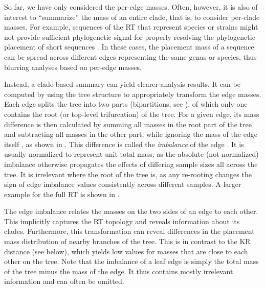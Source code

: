 So far, we have only considered the per-edge masses.
Often, however, it is also of interest to ``summarize'' the mass of an entire clade, that is, to consider per-clade masses.
For example, sequences of the \ac{RT} that represent species or strains might not provide sufficient phylogenetic signal
for properly resolving the phylogenetic placement of short sequences \cite{Dunthorn2014}.
In these cases, the placement mass of a sequence can be spread across different edges representing the same genus or species,
thus blurring analyses based on per-edge masses.

Instead, a clade-based summary can yield clearer analysis results.
It can be computed by using the tree structure to appropriately transform the edge masses.
Each edge splits the tree into two parts
(bipartitions, see ),
of which only one contains the root (or top-level trifurcation) of the tree.
For a given edge, its mass difference is then calculated by summing all masses in the root part of the tree
and subtracting all masses in the other part,
while ignoring the mass of the edge itself \cite{Matsen2011a}, as shown in .
This difference is called the \emph{imbalance} of the edge \cite{Matsen2011a}.
It is usually normalized to represent unit total mass,
as the absolute (not normalized) imbalance otherwise propagates the effects of differing sample sizes all across the tree.
It is irrelevant where the root of the tree is,
as any re-rooting changes the sign of edge imbalance values consistently across different samples.
A larger example for the full \ac{RT} is shown in .

The edge imbalance relates the masses on the two sides of an edge to each other.
This implicitly captures the \ac{RT} topology and reveals information about its clades.
Furthermore, this transformation can reveal differences in the placement mass distribution
of nearby branches of the tree.
This is in contrast to the KR distance (see  below),
which yields low values for masses that are close to each other on the tree.
Note that %
the imbalance of a leaf edge is simply the total mass of the tree minus the mass of the edge.
It thus contains mostly irrelevant information and can often be omitted.

